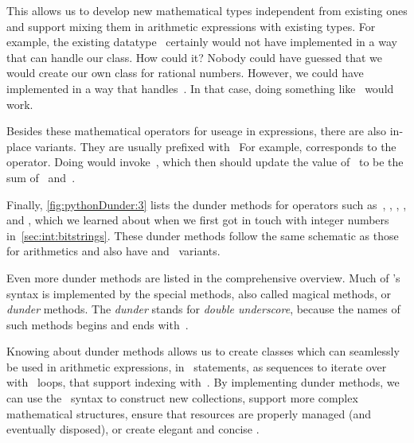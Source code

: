 This allows us to develop new mathematical types independent from existing ones and support mixing them in arithmetic expressions with existing types.
For example, the existing datatype~ certainly would not have  implemented in a way that can handle our  class.
How could it?
Nobody could have guessed that we would create our own class for rational numbers.
However, we could have implemented  in a way that handles~.
In that case, doing something like~ would work.

Besides these mathematical operators for useage in expressions, there are also in-place variants.
They are usually prefixed with~
For example,  corresponds to the~\pythonil{+=} operator.
Doing  would invoke~, which then should update the value of~ to be the sum of~ and~.

Finally, \cref{fig:pythonDunder:3} lists the dunder methods for operators such as~\pythonilIdx{\&}, \pythonil{|}\pythonIdx{\textbar}, \pythonil{\^}\pythonIdx{\textasciicircum}, \pythonil{>>}\pythonIdx{>\strut>}, and \pythonil{<<}\pythonIdx{<\strut<}, which we learned about when we first got in touch with integer numbers in~\cref{sec:int:bitstrings}.
These dunder methods follow the same schematic as those for arithmetics and also have  and ~variants.

Even more dunder methods are listed in the comprehensive overview.
%
\endhsection%
%
%
Much of \python's syntax is implemented by the special methods, also called magical methods, or \emph{dunder} methods.
The \emph{dunder} stands for \emph{double underscore}, because the names of such methods begins and ends with~\pythonilIdx{\_\_}.

Knowing about dunder methods allows us to create classes which can seamlessly be used in arithmetic expressions, in ~statements, as sequences to iterate over with ~loops, that support indexing with~\pythonil{[...]}\pythonIdx{[\idxdots]}.
By implementing dunder methods, we can use the \python\ syntax to construct new collections, support more complex mathematical structures, ensure that resources are properly managed (and eventually disposed), or create elegant and concise .%
\endhsection%
%
\FloatBarrier%
\endhsection%
